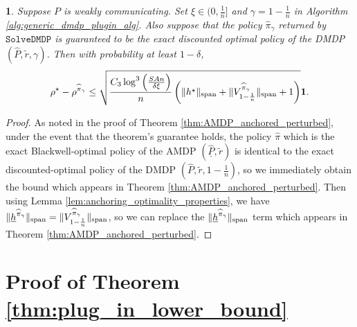 \documentclass{article}
\theoremstyle{plain}
\newtheorem{thm}{\protect\theoremname}
\theoremstyle{plain}
\theoremstyle{remark}
\theoremstyle{plain}
\theoremstyle{plain}
\providecommand{\theoremname}{Theorem}
\newcommand{\Phat}{\widehat{P}}
\newcommand{\one}{\mathbf{1}}
\newcommand{\pihat}{\widehat{\pi}}
\newcommand{\SolveDMDP}{\texttt{SolveDMDP}}
\newcommand{\Phatanc}{\underline{\Phat}}
\newcommand{\hanc}{\underline{h}}
\begin{document}
\begin{thm}
\label{thm:AMDP_anchored_perturbed_DMDP_red}
    Suppose $P$ is weakly communicating. Set $\xi \in (0, \frac{1}{n}]$ and $\gamma = 1-\frac{1}{n}$ in Algorithm \ref{alg:generic_dmdp_plugin_alg}. Also suppose that the policy $\pihat_\gamma$ returned by $\SolveDMDP$ is guaranteed to be the exact discounted optimal policy of the DMDP $(\Phat, \widetilde{r}, \gamma)$.
    Then with probability at least $1 - \delta$,
    \begin{align*}
        \rho^\star - \rho^{\pihat_\gamma}  \leq \sqrt{\frac{C_3  \log^3 \left( \frac{SAn}{ \delta \xi}\right) }{n}\left( \spannorm{h^\star} + \spannorm{V_{1-\frac{1}{n}}^{\pihat_\gamma}} + 1\right) } \one.
    \end{align*}
\end{thm}
\begin{proof}
    As noted in the proof of Theorem \ref{thm:AMDP_anchored_perturbed}, under the event that the theorem's guarantee holds, the policy $\pihat$ which is the exact Blackwell-optimal policy of the AMDP $(\Phatanc, \widetilde{r})$ is identical to the exact discounted-optimal policy of the DMDP $(\Phat, \widetilde{r}, 1 - \frac{1}{n})$, so we immediately obtain the bound which appears in Theorem \ref{thm:AMDP_anchored_perturbed}. Then using Lemma \ref{lem:anchoring_optimality_properties}, we have $\spannorm{\hanc^{\pihat_\gamma}} = \spannorm{V_{1-\frac{1}{n}}^{\pihat_\gamma}}$, so we can replace the $\spannorm{\hanc^{\pihat_\gamma}}$ term which appears in Theorem \ref{thm:AMDP_anchored_perturbed}.
\end{proof}

\section{Proof of Theorem \ref{thm:plug_in_lower_bound}}
\label{sec:proof_of_plug_in_lower_bound}
\end{document}
